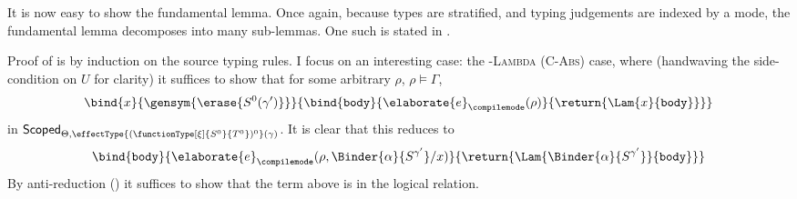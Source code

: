 It is now easy to show the fundamental lemma. Once again, because types are stratified, and typing judgements are indexed by a mode, the fundamental lemma decomposes into many sub-lemmas. One such is stated in .


Proof of  is by induction on the source \sourceLang{} typing rules. I focus on an interesting case: the \textsc{\compilemode{}-Lambda} (\textsc{C-Abs}) case, where (handwaving the side-condition on $U$ for clarity) it suffices to show that for some arbitrary $\rho$, $\rho \vDash \Gamma$, 
\[\bind{x}{\gensym{\erase{S^0 (\gamma')}}}{\bind{\texttt{body}}{\elaborate{e}_{\compilemode}({\rho})}{\return{\Lam{x}{\texttt{body}}}}}\]
in $\scoped{\effectType{(\functionType[\xi]{S^0}{T^0})^0} (\gamma)}$. It is clear that this reduces to
\[{\bind{\texttt{body}}{\elaborate{e}_{\compilemode}({\rho, \Binder{\alpha}{S^{\gamma'}} / x})}{\return{\Lam{\Binder{\alpha}{S^{\gamma'}}}{\texttt{body}}}}}\]
 By anti-reduction () it suffices to show that the term above is in the logical relation. 
 
